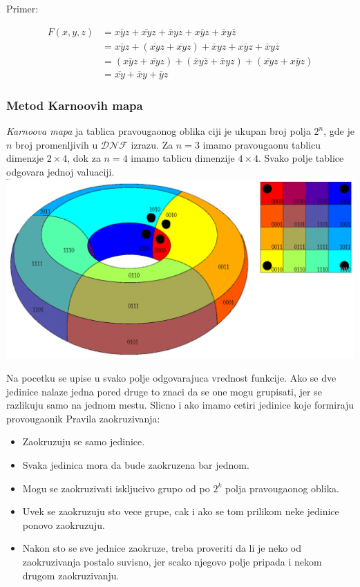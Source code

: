 \documentclass[12p,a4paper]{article}
\begin{document}
\begin{multicols}{2}
    Primer:

    \begin{align*}
        F(x, y, z) &=
        \overline{xyz} + \overline{xy}z + \overline{x}yz + 
        x\overline{y}z + \overline{x}y\overline{z} \\
        &= \overline{xyz} + (\overline{xy}z + \overline{xy}z) + 
        \overline{x}yz + x\overline{y}z + \overline{x}y\overline{z} \\
        &= (\overline{xyz} + \overline{xy}z) + 
        (\overline{x}y\overline{z} + \overline{x}yz) + 
        (\overline{xy}z +  x\overline{y}z) \\
        &= \overline{xy} + \overline{x}y + \overline{y}z
    \end{align*}

    \subsubsection{Metod Karnoovih mapa}

    \emph{Karnoova mapa} ja tablica pravougaonog oblika ciji je ukupan broj 
    polja $2^n$, gde je $n$ broj promenljivih u $\mathcal{DNF}$ izrazu.
    Za $n = 3$ imamo pravougaonu tablicu dimenzje $2 \times 4$, dok za $n = 4$
    imamo tablicu dimenzije $4 \times 4$. Svako polje tablice odgovara jednoj 
    valuaciji.
    \includegraphics[width=\columnwidth]{Figures/torus.png}

    Na pocetku se upise u svako polje odgovarajuca vrednost funkcije.
    Ako se dve jedinice nalaze jedna pored druge to znaci da se one mogu 
    grupisati, jer se razlikuju samo na jednom mestu.
    Slicno i ako imamo cetiri jedinice koje formiraju provougaonik
    Pravila zaokruzivanja:
    \begin{itemize}
        \itemsep0em
        \item Zaokruzuju se samo jedinice.
        \item Svaka jedinica mora da bude zaokruzena bar jednom.
        \item Mogu se zaokruzivati iskljucivo grupo od po $2^k$ polja 
              pravougaonog oblika.
        \item Uvek se zaokruzuju sto vece grupe, cak i ako se tom prilikom 
              neke jedinice ponovo zaokruzuju.
        \item Nakon sto se sve jednice zaokruze, treba proveriti da li je neko 
              od zaokruzivanja postalo suvisno, jer scako njegovo polje 
              pripada i nekom drugom zaokruzivanju.
    \end{itemize}


\end{multicols}
\end{document}
